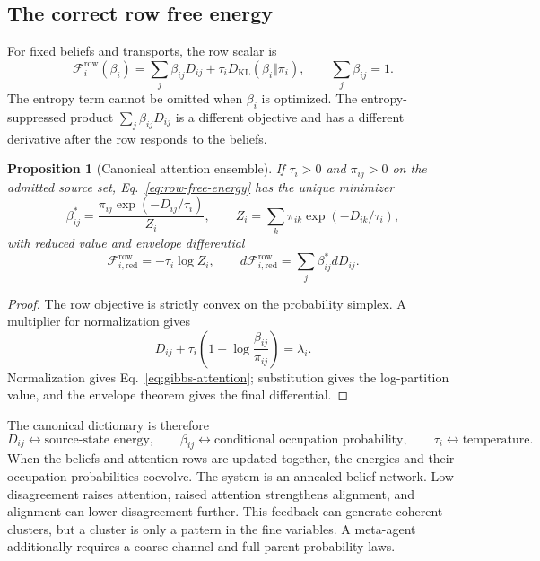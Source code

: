 \documentclass[11pt,letterpaper]{article}
\newcommand{\KL}{D_{\mathrm{KL}}}
\newcommand{\cF}{\mathcal F}
\newtheorem{proposition}{Proposition}
\begin{document}
\subsection{The correct row free energy}

For fixed beliefs and transports, the row scalar is
\begin{equation}
 \boxed{
 \cF_i^{\mathrm{row}}(\beta_i)
 =\sum_j\beta_{ij}D_{ij}
 +\tau_i\KL(\beta_i\Vert\pi_i),
 \qquad \sum_j\beta_{ij}=1.}
 \label{eq:row-free-energy}
\end{equation}
The entropy term cannot be omitted when $\beta_i$ is optimized.  The entropy-suppressed product $\sum_j\beta_{ij}D_{ij}$ is a different objective and has a different derivative after the row responds to the beliefs.

\begin{proposition}[Canonical attention ensemble]
If $\tau_i>0$ and $\pi_{ij}>0$ on the admitted source set, Eq.~\eqref{eq:row-free-energy} has the unique minimizer
\begin{equation}
 \beta_{ij}^*
 =\frac{\pi_{ij}\exp(-D_{ij}/\tau_i)}{Z_i},
 \qquad
 Z_i=\sum_k\pi_{ik}\exp(-D_{ik}/\tau_i),
 \label{eq:gibbs-attention}
\end{equation}
with reduced value and envelope differential
\begin{equation}
 \cF_{i,\mathrm{red}}^{\mathrm{row}}
 =-\tau_i\log Z_i,
 \qquad
 d\cF_{i,\mathrm{red}}^{\mathrm{row}}
 =\sum_j\beta_{ij}^*dD_{ij}.
 \label{eq:row-envelope}
\end{equation}
\end{proposition}

\begin{proof}
The row objective is strictly convex on the probability simplex.  A multiplier for normalization gives
\begin{equation}
 D_{ij}+\tau_i\left(1+\log\frac{\beta_{ij}}{\pi_{ij}}\right)=\lambda_i.
\end{equation}
Normalization gives Eq.~\eqref{eq:gibbs-attention}; substitution gives the log-partition value, and the envelope theorem gives the final differential.
\end{proof}

The canonical dictionary is therefore
\begin{equation}
 D_{ij}\longleftrightarrow\text{source-state energy},
 \qquad
 \beta_{ij}\longleftrightarrow\text{conditional occupation probability},
 \qquad
 \tau_i\longleftrightarrow\text{temperature}.
 \label{eq:canonical-dictionary}
\end{equation}
When the beliefs and attention rows are updated together, the energies and their occupation probabilities coevolve.  The system is an annealed belief network.  Low disagreement raises attention, raised attention strengthens alignment, and alignment can lower disagreement further.  This feedback can generate coherent clusters, but a cluster is only a pattern in the fine variables.  A meta-agent additionally requires a coarse channel and full parent probability laws.
\end{document}
